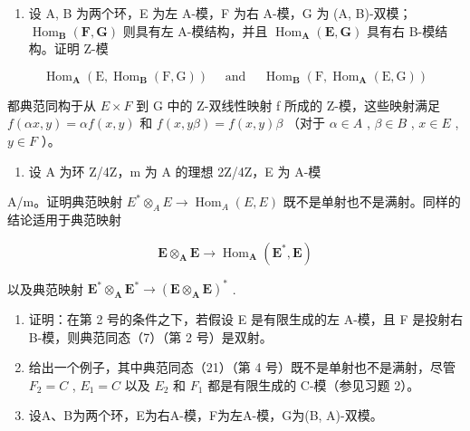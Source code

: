 \BourbakiExercisesSection

\begin{enumerate}
\def\labelenumi{\arabic{enumi}.}
\tightlist
\item
  设 A, B 为两个环，E 为左 A-模，F 为右 A-模，G 为 (A, B)-双模； \(\operatorname{Hom}_{\mathbf{B}}(\mathbf{F}, \mathbf{G})\) 则具有左 A-模结构，并且 \(\operatorname{Hom}_{\mathbf{A}}(\mathbf{E}, \mathbf{G})\) 具有右 B-模结构。证明 Z-模
\end{enumerate}

\[
\operatorname{Hom} _ {\mathbf {A}} (\mathrm{E}, \operatorname{Hom} _ {\mathbf {B}} (\mathrm{F}, \mathrm{G})) \quad \text { and } \quad \operatorname{Hom} _ {\mathbf {B}} (\mathrm{F}, \operatorname{Hom} _ {\mathbf {A}} (\mathrm{E}, \mathrm{G}))
\]

都典范同构于从 \(E \times F\) 到 G 中的 Z-双线性映射 f 所成的 Z-模，这些映射满足 \(f(\alpha x, y) = \alpha f(x, y)\) 和 \(f(x, y\beta) = f(x, y)\beta\) （对于 \(\alpha \in A\) , \(\beta \in B\) , \(x \in E\) , \(y \in F\) ）。

\begin{enumerate}
\def\labelenumi{\arabic{enumi}.}
\setcounter{enumi}{1}
\tightlist
\item
  设 A 为环 Z/4Z，m 为 A 的理想 2Z/4Z，E 为 A-模
\end{enumerate}

A/m。证明典范映射 \(E^{*} \otimes_{A} E \to \operatorname{Hom}_{A}(E, E)\) 既不是单射也不是满射。同样的结论适用于典范映射

\[
\mathbf {E} \otimes_ {\mathbf {A}} \mathbf {E} \rightarrow \operatorname{Hom} _ {\mathbf {A}} (\mathbf {E} ^ {*}, \mathbf {E})
\]

以及典范映射 \(\mathbf{E}^{*}\otimes_{\mathbf{A}}\mathbf{E}^{*}\to (\mathbf{E}\otimes_{\mathbf{A}}\mathbf{E})^{*}\) .

\begin{enumerate}
\def\labelenumi{\arabic{enumi}.}
\setcounter{enumi}{2}
\item
  证明：在第 2 号的条件之下，若假设 E 是有限生成的左 A-模，且 F 是投射右 B-模，则典范同态（7）（第 2 号）是双射。
\item
  给出一个例子，其中典范同态（21）（第 4 号）既不是单射也不是满射，尽管 \(F_{2} = C\) , \(E_{1} = C\) 以及 \(E_{2}\) 和 \(F_{1}\) 都是有限生成的 C-模（参见习题 2）。
\item
  设A、B为两个环，E为右A-模，F为左A-模，G为(B, A)-双模。
\end{enumerate}

